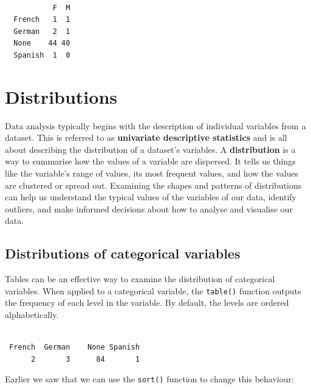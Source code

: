 \documentclass[
  letterpaper,
  DIV=11,
  numbers=noendperiod]{scrreprt}
\newenvironment{Shaded}{\begin{snugshade}}{\end{snugshade}}
\newcommand{\AttributeTok}[1]{\textcolor[rgb]{0.40,0.45,0.13}{#1}}
\newcommand{\ConstantTok}[1]{\textcolor[rgb]{0.56,0.35,0.01}{#1}}
\newcommand{\FunctionTok}[1]{\textcolor[rgb]{0.28,0.35,0.67}{#1}}
\newcommand{\NormalTok}[1]{\textcolor[rgb]{0.00,0.23,0.31}{#1}}
\newcommand{\SpecialCharTok}[1]{\textcolor[rgb]{0.37,0.37,0.37}{#1}}
\begin{document}
\begin{verbatim}
         
           F  M
  French   1  1
  German   2  1
  None    44 40
  Spanish  1  0
\end{verbatim}

\section{Distributions}\label{sec-Distributions}

Data analysis typically begins with the description of individual
variables from a dataset. This is referred to as \textbf{univariate
descriptive statistics} and is all about describing the distribution of
a dataset's variables. A \textbf{distribution} is a way to summarise how
the values of a variable are dispersed. It tells us things like the
variable's range of values, its most frequent values, and how the values
are clustered or spread out. Examining the shapes and patterns of
distributions can help us understand the typical values of the variables
of our data, identify outliers, and make informed decisions about how to
analyse and visualise our data.

\subsection{Distributions of categorical variables}\label{sec-DistCat}

Tables can be an effective way to examine the distribution of
categorical variables. When applied to a categorical variable, the
\texttt{table()} function outputs the frequency of each level in the
variable. By default, the levels are ordered alphabetically.

\begin{Shaded}
\end{Shaded}

\begin{verbatim}

 French  German    None Spanish 
      2       3      84       1 
\end{verbatim}

Earlier we saw that we can use the \texttt{sort()} function to change
this behaviour:

\begin{Shaded}
\end{Shaded}
\end{document}
